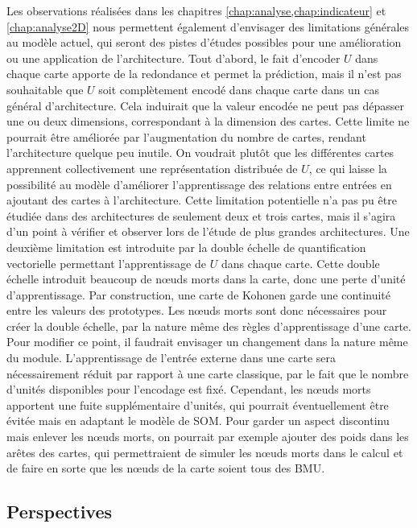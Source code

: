 Les observations réalisées dans les chapitres \ref{chap:analyse,chap:indicateur} et \ref{chap:analyse2D} nous permettent également d'envisager des limitations générales au modèle actuel, qui seront des pistes d'études possibles pour une amélioration ou une application de l'architecture.
Tout d'abord, le fait d'encoder $U$ dans chaque carte apporte de la redondance et permet la prédiction, mais il n'est pas souhaitable que $U$ soit complètement encodé dans chaque carte dans un cas général d'architecture.
Cela induirait que la valeur encodée ne peut pas dépasser une ou deux dimensions, correspondant à la dimension des cartes. Cette limite ne pourrait être améliorée par l'augmentation du nombre de cartes, rendant l'architecture quelque peu inutile. 
On voudrait plutôt que les différentes cartes apprennent collectivement une représentation distribuée de $U$, ce qui laisse la possibilité au modèle d'améliorer l'apprentissage des relations entre entrées en ajoutant des cartes à l'architecture. Cette limitation potentielle n'a pas pu être étudiée dans des architectures de seulement deux et trois cartes, mais il s'agira d'un point à vérifier et observer lors de l'étude de plus grandes architectures. 
Une deuxième limitation est introduite par la double échelle de quantification vectorielle permettant l'apprentissage de $U$ dans chaque carte. 
Cette double échelle introduit beaucoup de n\oe{}uds morts dans la carte, donc une perte d'unité d'apprentissage. 
Par construction, une carte de Kohonen garde une continuité entre les valeurs des prototypes. Les n\oe{}uds morts sont donc nécessaires pour créer la double échelle, par la nature même des règles d'apprentissage d'une carte.
Pour modifier ce point, il faudrait envisager un changement dans la nature même du module.
L'apprentissage de l'entrée externe dans une carte sera nécessairement réduit par rapport à une carte classique, par le fait que le nombre d'unités disponibles pour l'encodage est fixé.
Cependant, les n\oe{}uds morts apportent une fuite supplémentaire d'unités, qui pourrait éventuellement être évitée mais en adaptant le modèle de SOM.
Pour garder un aspect discontinu mais enlever les n\oe{}uds morts, on pourrait par exemple ajouter des poids dans les arêtes des cartes, qui permettraient de simuler les n\oe{}uds morts dans le calcul et de faire en sorte que les n\oe{}uds de la carte soient tous des BMU.
   

\subsection*{Perspectives}

